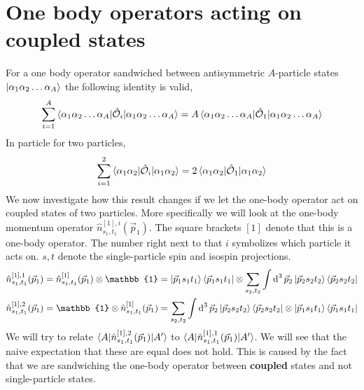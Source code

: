 \documentclass[10pt]{article}
\begin{document}
\section{One body operators acting on coupled states}
For a one body operator sandwiched between antisymmetric $A$-particle states $\ket{ \alpha_1 \alpha_2 \ldots \alpha_A}$ the following identity is valid,
\begin{align*}
	\sum_{i=1}^{A} \braket{ \alpha_1 \alpha_2 \ldots \alpha_A | \hat{\mathcal{O}}_{i} | \alpha_1 \alpha_2 \ldots \alpha_A} = A \braket{ \alpha_1 \alpha_2 \ldots \alpha_A | \hat{\mathcal{O}}_{1} | \alpha_1 \alpha_2 \ldots \alpha_A}
\end{align*}
In particle for two particles,
\begin{align*}
	\sum_{i=1}^{2} \braket{ \alpha_1 \alpha_2 | \hat{\mathcal{O}}_{i} | \alpha_1 \alpha_2} = 2 \braket{ \alpha_1 \alpha_2 | \hat{\mathcal{O}}_{1} | \alpha_1 \alpha_2}
\end{align*}
We now investigate how this result changes if we let the one-body operator act on coupled states of two particles. More specifically we will look at the one-body momentum operator $\hat{n}^{[1],i}_{s_1,t_1}(\vec{p}_1)$. The square brackets $[1]$ denote that this is a one-body operator. The number right next to that $i$ symbolizes which particle it acts on. $s,t$ denote the single-particle spin and isospin projections.
\begin{align*}
	\hat{n}^{[1],1}_{s_1,t_1}(\vec{p}_1) &= \hat{n}^{[1]}_{s_1,t_1}(\vec{p}_1) \otimes \mathbb{1} = \ket{\vec{p}_1 s_1 t_1} \bra{ \vec{p}_1 s_1 t_1} \otimes \sum_{s_2,t_2} \int \text{d}^{3} \, \vec{p}_{2} \ket{ \vec{p}_2 s_2 t_2} \bra{ \vec{p}_2 s_2 t_2} \\
	\hat{n}^{[1],2}_{s_1,t_1}(\vec{p}_1) &= \mathbb{1} \otimes \hat{n}^{[1]}_{s_1,t_1}(\vec{p}_1) = \sum_{s_2,t_2} \int \text{d}^{3} \, \vec{p}_{2} \ket{ \vec{p}_2 s_2 t_2} \bra{ \vec{p}_2 s_2 t_2} \otimes \ket{ \vec{p}_1 s_1 t_1} \bra{ \vec{p}_1 s_1 t_1} 
\end{align*}
We will try to relate $ \braket{ A | \hat{n}^{[1],2}_{s_1,t_1}(\vec{p}_1) | A'}$ to $ \braket{ A | \hat{n}^{[1],1}_{s_1,t_1}(\vec{p}_1) | A'}$. We will see that the naive expectation that these are equal does not hold. This is caused by the fact that we are sandwiching the one-body operator between \textbf{coupled} states and not single-particle states.
\end{document}
